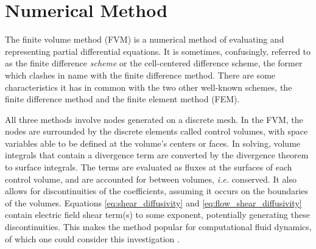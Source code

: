 \chapter{Numerical Method}\label{chapter:numerical_method}
The finite volume method (FVM) is a numerical method of evaluating and representing partial differential equations.
It is sometimes, confusingly, referred to as the finite difference \emph{scheme} or the cell-centered difference scheme, the former which clashes in name with the finite difference method.
There are some characteristics it has in common with the two other well-known schemes, the finite difference method and the finite element method (FEM).

All three methods involve nodes generated on a discrete mesh.
In the FVM, the nodes are surrounded by the discrete elements called control volumes, with space variables able to be defined at the volume's centers or faces.
In solving, volume integrals that contain a divergence term are converted by the divergence theorem to surface integrals.
The terms are evaluated as fluxes at the surfaces of each control volume, and are accounted for between volumes, \emph{i.e.} conserved.
It also allows for discontinuities of the coefficients, assuming it occurs on the boundaries of the volumes.
Equations \ref{eq:shear_diffusivity} and \ref{eq:flow_shear_diffusivity} contain electric field shear term(s) to some exponent, potentially generating these discontinuities.
This makes the method popular for computational fluid dynamics, of which one could consider this investigation \cite{eymard_finite_2003}.


